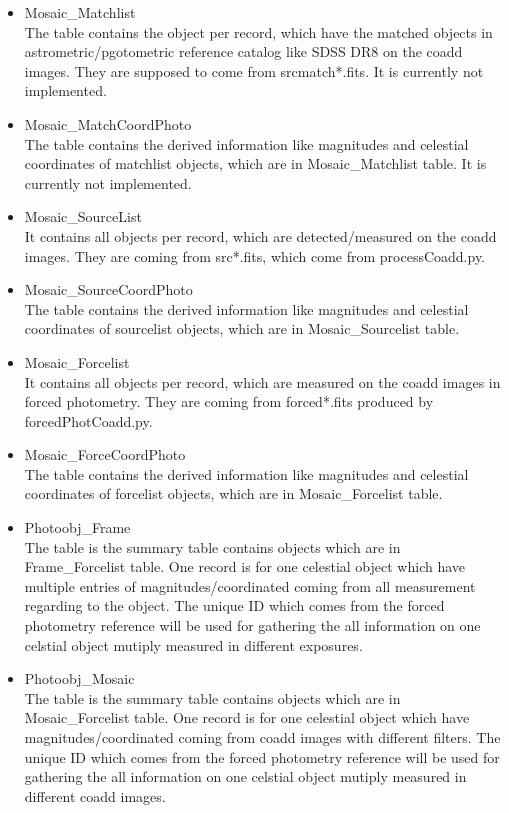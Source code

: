\documentclass[12pt]{article}
\begin{document}
\begin{enumerate}
\begin{itemize}
\item Mosaic\_Matchlist\\
The table contains the object per record, which have the matched objects in astrometric/pgotometric 
reference catalog like SDSS DR8 on the coadd images. They are supposed to come from srcmatch*.fits. 
It is currently not implemented. 

\item Mosaic\_MatchCoordPhoto\\
The table contains the derived information like magnitudes and celestial coordinates of matchlist 
objects, which are in Mosaic\_Matchlist table. It is currently not implemented.  

\item Mosaic\_SourceList\\
It contains all objects per record, which are detected/measured on the coadd images. They 
are coming from src*.fits, which come from processCoadd.py. 

\item Mosaic\_SourceCoordPhoto\\
The table contains the derived information like magnitudes and celestial coordinates of sourcelist 
objects, which are in Mosaic\_Sourcelist table. 

\item Mosaic\_Forcelist\\
It contains all objects per record, which are measured on the coadd images in forced photometry. 
They are coming from forced*.fits produced by forcedPhotCoadd.py. 

\item Mosaic\_ForceCoordPhoto\\
The table contains the derived information like magnitudes and celestial coordinates of forcelist 
objects, which are in Mosaic\_Forcelist table. 

\item Photoobj\_Frame\\
The table is the summary table contains objects which are in Frame\_Forcelist table. One record is 
for one celestial object which have multiple entries of magnitudes/coordinated coming from all 
measurement regarding to the object. The unique ID which comes from the forced photometry reference 
will be used for gathering the all information on one celstial object mutiply measured in different 
exposures. 

\item Photoobj\_Mosaic\\
The table is the summary table contains objects which are in Mosaic\_Forcelist table. One record is 
for one celestial object which have magnitudes/coordinated coming from coadd images with different 
filters. The unique ID which comes from the forced photometry reference will be used for gathering 
the all information on one celstial object mutiply measured in different coadd images. 

\end{itemize}
\end{enumerate}
\end{document}
